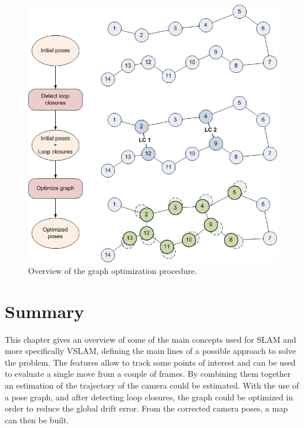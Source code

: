 \begin{figure}[H]
\centering
\includegraphics[width=1\textwidth]{figures/graph_overview}
\caption{Overview of the graph optimization procedure. }
\label{fig:graph_overview}
\end{figure}

\clearpage
\section{Summary}

This chapter gives an overview of some of the main concepts used for \gls{SLAM} and more specifically \gls{VSLAM}, defining the main lines of a possible approach to solve the problem. The features allow to track some points of interest and can be used to evaluate a single move from a couple of frames. By combining them together an estimation of the trajectory of the camera could be estimated. With the use of a pose graph, and after detecting loop closures, the graph could be optimized in order to reduce the global drift error. From the corrected camera poses, a map can then be built. 

